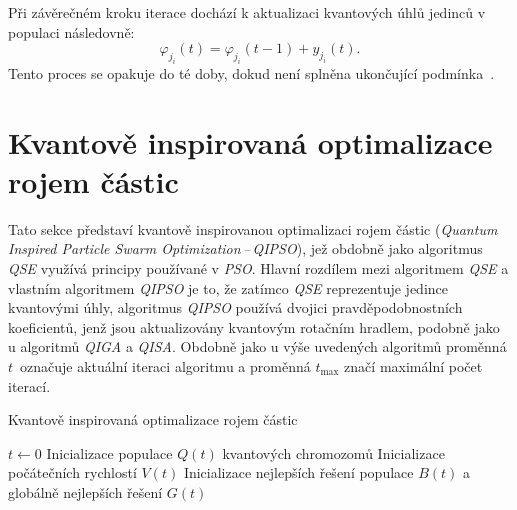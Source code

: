 Při závěrečném kroku iterace dochází k aktualizaci kvantových úhlů jedinců v populaci následovně:
\begin{equation*}
    \varphi_{j_i}\left(t\right) = \varphi_{j_i}\left(t-1\right) + y_{j_i}\left(t\right).
\end{equation*}
Tento proces se opakuje do té doby, dokud není splněna ukončující podmínka~\cite{qse}.

\section{Kvantově inspirovaná optimalizace rojem částic}\label{sec:qipso}
Tato sekce představí kvantově inspirovanou optimalizaci rojem částic (\emph{Quantum Inspired Particle Swarm Optimization\,--\,QIPSO}), jež obdobně jako algoritmus \emph{QSE} využívá principy používané v \emph{PSO}. 
Hlavní rozdílem mezi algoritmem \emph{QSE} a vlastním algoritmem \emph{QIPSO} je to, že zatímco \emph{QSE} reprezentuje jedince kvantovými úhly, algoritmus \emph{QIPSO} používá dvojici pravděpodobnostních koeficientů, jenž jsou aktualizovány kvantovým rotačním hradlem, podobně jako u algoritmů \emph{QIGA} a \emph{QISA}. 
Obdobně jako u výše uvedených algoritmů proměnná $t$~označuje aktuální iteraci algoritmu a proměnná $t_{\text{max}}$ značí maximální počet iterací. 

\begin{algorithm}[ht]
    \caption{Kvantově inspirovaná optimalizace rojem částic}
    \label{alg:qipso}
    $t \gets 0$\;
    Inicializace populace $Q\left(t\right)$ kvantových chromozomů\;
    Inicializace počátečních rychlostí $V\left(t\right)$\;
    Inicializace nejlepších řešení populace $B\left(t\right)$ a globálně nejlepších řešení $G\left(t\right)$\;
\end{algorithm}

